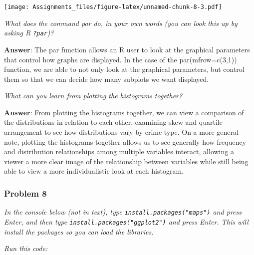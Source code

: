 \documentclass[
]{article}
\newenvironment{Shaded}{\begin{snugshade}}{\end{snugshade}}
\newcommand{\AttributeTok}[1]{\textcolor[rgb]{0.77,0.63,0.00}{#1}}
\newcommand{\FunctionTok}[1]{\textcolor[rgb]{0.00,0.00,0.00}{#1}}
\newcommand{\NormalTok}[1]{#1}
\newcommand{\SpecialCharTok}[1]{\textcolor[rgb]{0.00,0.00,0.00}{#1}}
\newcommand{\StringTok}[1]{\textcolor[rgb]{0.31,0.60,0.02}{#1}}
\begin{document}
\texttt{[image: Assignments\_files/figure-latex/unnamed-chunk-8-3.pdf]}

\emph{What does the command par do, in your own words (you can look this
up by asking R \texttt{?par})?}

\textbf{Answer}: The par function allows an R user to look at the
graphical parameters that control how graphs are displayed. In the case
of the par(mfrow=c(3,1)) function, we are able to not only look at the
graphical parameters, but control them so that we can decide how many
subplots we want displayed.

\emph{What can you learn from plotting the histograms together?}

\textbf{Answer}: From plotting the histograms together, we can view a
comparison of the distributions in relation to each other, examining
skew and quartile arrangement to see how distributions vary by crime
type. On a more general note, plotting the histograms together allows us
to see generally how frequency and distribution relationships among
multiple variables interact, allowing a viewer a more clear image of the
relationship between variables while still being able to view a more
individualistic look at each histogram.

\hypertarget{problem-8}{%
\subsubsection{Problem 8}\label{problem-8}}

\emph{In the console below (not in text), type
\texttt{install.packages("maps")} and press Enter, and then type
\texttt{install.packages("ggplot2")} and press Enter. This will install
the packages so you can load the libraries.}

\emph{Run this code:}

\begin{Shaded}
\end{Shaded}
\end{document}
